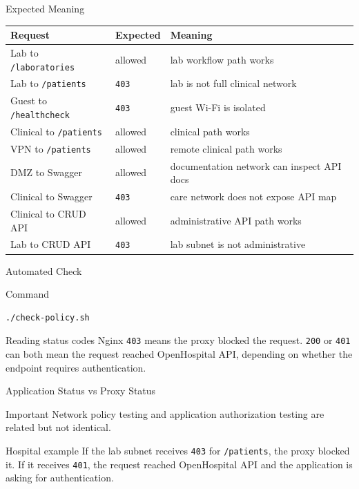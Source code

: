 \documentclass[presentation]{beamer}
\begin{document}
\begin{frame}[c]{Expected Meaning}
\small
\begin{tabularx}{\textwidth}{@{}p{}p{}X@{}}
\toprule
\textbf{Request} & \textbf{Expected} & \textbf{Meaning} \\
\midrule
Lab to \texttt{/laboratories} & allowed & lab workflow path works \\
Lab to \texttt{/patients} & \texttt{403} & lab is not full clinical network \\
Guest to \texttt{/healthcheck} & \texttt{403} & guest Wi-Fi is isolated \\
Clinical to \texttt{/patients} & allowed & clinical path works \\
VPN to \texttt{/patients} & allowed & remote clinical path works \\
DMZ to Swagger & allowed & documentation network can inspect API docs \\
Clinical to Swagger & \texttt{403} & care network does not expose API map \\
Clinical to CRUD API & allowed & administrative API path works \\
Lab to CRUD API & \texttt{403} & lab subnet is not administrative \\
\bottomrule
\end{tabularx}
\end{frame}

\begin{frame}[fragile,c]{Automated Check}
\begin{block}{Command}
\begin{verbatim}
./check-policy.sh
\end{verbatim}
\end{block}

\begin{exampleblock}{Reading status codes}
Nginx \texttt{403} means the proxy blocked the request. \texttt{200} or \texttt{401} can both mean
the request reached OpenHospital API, depending on whether the endpoint requires authentication.
\end{exampleblock}
\end{frame}

\begin{frame}[c]{Application Status vs Proxy Status}
\begin{block}{Important}
Network policy testing and application authorization testing are related but not identical.
\end{block}

\begin{exampleblock}{Hospital example}
If the lab subnet receives \texttt{403} for \texttt{/patients}, the proxy blocked it. If it receives
\texttt{401}, the request reached OpenHospital API and the application is asking for authentication.
\end{exampleblock}
\end{frame}
\end{document}
